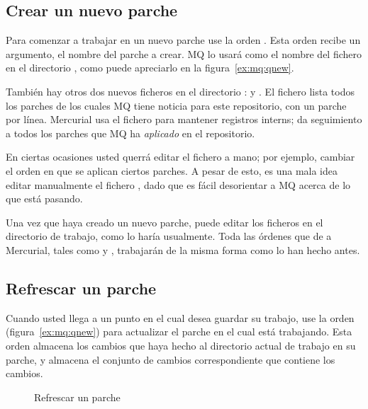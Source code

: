 \subsection{Crear un nuevo parche}

Para comenzar a trabajar en un nuevo parche use la orden
. Esta orden recibe un argumento, el nombre del
parche a crear.  MQ lo usará como el nombre del fichero en el
directorio , como puede apreciarlo en la
figura~\ref{ex:mq:qnew}.

También hay otros dos nuevos ficheros en el directorio
:   y .  El
fichero  lista todos los parches de los cuales MQ
tiene noticia para este repositorio, con un parche por línea.
Mercurial usa el fichero  para mantener registros
interns; da seguimiento a todos los parches que MQ ha \emph{aplicado}
en el repositorio.

\begin{note}
  En ciertas ocasiones usted querrá editar el fichero
   a mano; por ejemplo, cambiar el orden en que se
  aplican ciertos parches.  A pesar de esto, es una mala idea editar
  manualmente  el fichero , dado que es fácil
  desorientar a MQ acerca de lo que está pasando.
\end{note}

Una vez que haya creado un nuevo parche, puede editar los ficheros en
el directorio de trabajo, como lo haría usualmente.  Toda las órdenes
que de a Mercurial, tales como  y ,
trabajarán de la misma forma como lo han hecho antes.

\subsection{Refrescar un parche}

Cuando usted llega a un punto en el cual desea guardar su trabajo, use
la orden  (figura~\ref{ex:mq:qnew}) para
actualizar el parche en el cual está trabajando.  Esta orden almacena
los cambios que haya hecho al directorio actual de trabajo en su
parche, y almacena el conjunto de cambios correspondiente que contiene
los cambios.

\begin{figure}[ht]
  \caption{Refrescar un parche}
  \label{ex:mq:qrefresh}
\end{figure}

